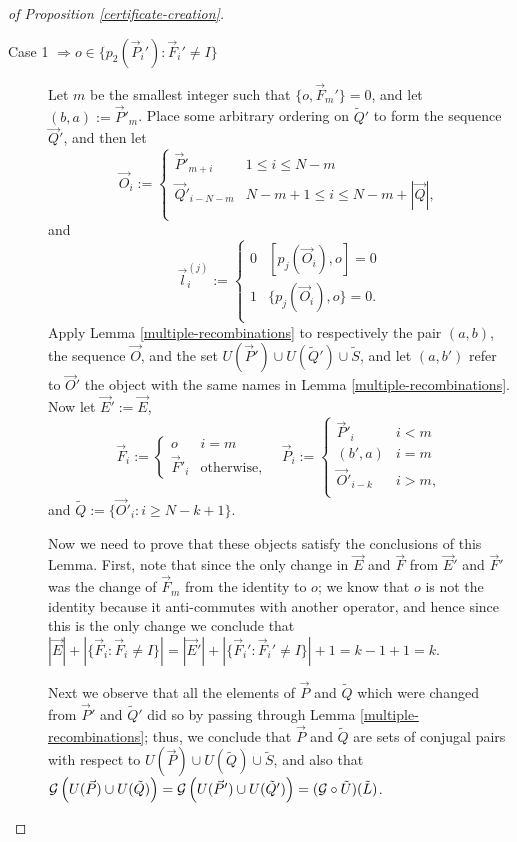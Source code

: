 \documentclass[twocolumn,showpacs,preprintnumbers,amsmath,amssymb,nofootinbib,pra,floatfix]{revtex4-1}
\newcommand{\lst}{\vec}
\newcommand{\set}{\tilde}
\newcommand{\genfun}{\mathcal{G}}
\begin{document}
\begin{proof}[of Proposition \ref{certificate-creation}]
\begin{description}
\item[Case 1 $\Rightarrow o\in\{p_2(\lst P_i'):\lst F_i' \ne I\}$]
Let $m$ be the smallest integer such that $\{o,\lst F_m'\}=0$, and let $(b,a):=\lst P'_m$.  Place some arbitrary ordering on $\set Q'$ to form the sequence $\lst Q'$, and then let
$$\lst O_i :=
\begin{cases}
\lst P'_{m+i} & 1 \le i \le N-m \\
\lst Q'_{i-N-m} & N-m+1 \le i \le N-m+|\lst Q|, \\
\end{cases}
$$
and
$$\lst l^{(j)}_i :=
\begin{cases}
0 & [p_j(\lst O_i),o] = 0 \\
1 & \{p_j(\lst O_i),o\} = 0. \\
\end{cases}
$$
Apply Lemma \ref{multiple-recombinations} to respectively the pair $(a,b)$, the sequence $\lst O$, and the set $U(\lst P')\cup U(\set Q')\cup \set S$, and let $(a,b')$ refer to $\lst O'$ the object with the same names in Lemma \ref{multiple-recombinations}.  Now let $\lst E':= \lst E$,
$$\lst F_i := 
\begin{cases}
o & i = m \\
\lst F'_i & \text{otherwise},
\end{cases}
\quad
\lst P_i :=
\begin{cases}
\lst P'_i & i < m \\
(b',a) & i = m \\
\lst O'_{i-k} & i > m, \\
\end{cases}
$$
and $\set Q := \{\lst O'_i : i \ge N-k+1\}$.

Now we need to prove that these objects satisfy the conclusions of this Lemma.  First, note that since the only change in $\lst E$ and $\lst F$ from $\lst E'$ and $\lst F'$ was the change of $\lst F_m$ from the identity to $o$;  we know that $o$ is not the identity because it anti-commutes with another operator, and hence since this is the only change we conclude that $|\lst E|+|\{\lst F_i : \lst F_i\ne I\}|=|\lst E'|+|\{\lst F_i' : \lst F_i'\ne I\}|+1=k-1+1=k$.

Next we observe that all the elements of $\lst P$ and $\set Q$ which were changed from $\lst P'$ and $\set Q'$ did so by passing through Lemma \ref{multiple-recombinations};  thus, we conclude that $\lst P$ and $\set Q$ are sets of conjugal pairs with respect to $U(\lst P)\cup U(\set Q)\cup \set S$, and also that $\genfun\paren{U(\lst P)\cup U(\set Q)}=\genfun\paren{U(\lst P')\cup U(\set Q')}=(\genfun\circ\set U)(\set L)$.


\end{description}
\end{proof}
\end{document}
